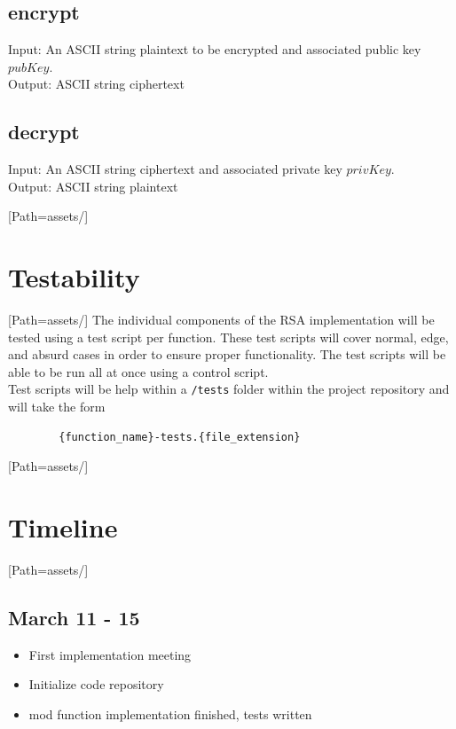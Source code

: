 \documentclass{article}
\begin{document}
    \subsection{encrypt}
    Input: An ASCII string plaintext to be encrypted and associated public key \(pubKey\).
    \\
    Output: ASCII string ciphertext
    \\
     \subsection{decrypt}
    Input: An ASCII string ciphertext and associated private key \(privKey\).
    \\
    Output: ASCII string plaintext
    \\
\newpage

\setmainfont{OpenSans-VariableFont_wdth,wght.ttf}[Path=assets/]
\section{Testability}
\setmainfont{OpenSans-VariableFont_wdth,wght.ttf}[Path=assets/]
    The individual components of the RSA implementation will be tested using a test script per function.
    These test scripts will cover normal, edge, and absurd cases in order to ensure proper functionality.
    The test scripts will be able to be run all at once using a control script.
    \\
    Test scripts will be help within a \verb|/tests| folder within the project repository and will take the form
    \begin{verbatim}
        {function_name}-tests.{file_extension}
    \end{verbatim}
\newpage

\setmainfont{OpenSans-VariableFont_wdth,wght.ttf}[Path=assets/]
\section{Timeline}
\setmainfont{OpenSans-VariableFont_wdth,wght.ttf}[Path=assets/]
    \subsection{March 11 - 15}
        \begin{itemize}
            \item First implementation meeting
            \item Initialize code repository
            \item mod function implementation finished, tests written
        \end{itemize}
\end{document}
